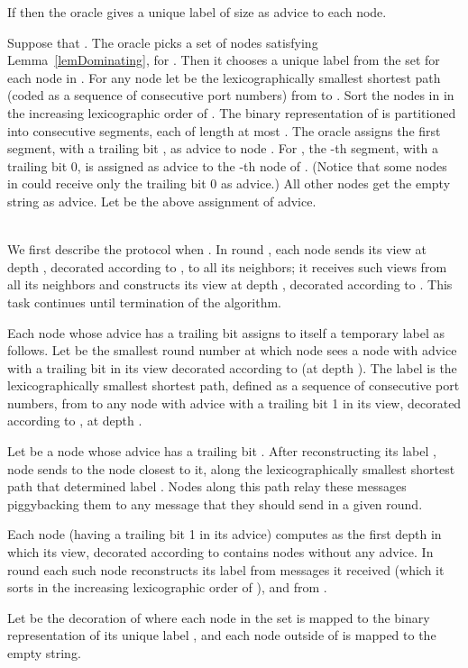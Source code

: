 \documentclass{article}
\begin{document}
If  then the oracle gives a unique label of size  as advice to each node.

Suppose that .
The oracle picks a set of nodes  satisfying Lemma~\ref{lemDominating}, for .
Then it chooses a unique label  from the set  for each node  in .
For any node  let  be the lexicographically smallest shortest path (coded as a sequence of consecutive port numbers) from  to .
Sort the nodes  in  in the increasing lexicographic order of .
The binary representation of  is partitioned into  consecutive segments, each of length at most .
The oracle assigns the first segment, with a trailing bit ,  as advice to node .
For , the -th segment, with a trailing bit 0, is assigned as advice to the -th  node of . (Notice that some nodes in  could receive only the trailing bit 0 as advice.) All other nodes get the empty string as advice.
Let  be the above assignment of advice.

\\
We first describe the protocol when .
In round , each node  sends its view at depth , decorated according to , to all its neighbors;
it receives such views from all its neighbors and constructs its view at depth , decorated according to .
This task continues until termination of the algorithm.

Each node  whose advice has a trailing bit  assigns to itself a temporary label  as follows.
Let  be the smallest round number at which node  sees a node with advice with a trailing bit  in its view decorated according to   (at depth ).
The label  is the lexicographically smallest shortest path, defined as a sequence of consecutive port numbers, from  to any node with advice with a trailing bit 1 in its  view, decorated according to , at depth .

Let  be a node whose advice has a trailing bit . After reconstructing its label , node  sends  to the node  closest to it, along the lexicographically smallest shortest path that determined label . Nodes along this path relay these messages piggybacking them to any message that they should send in a given round.


Each  node  (having a trailing bit 1 in its advice) computes  as the first depth in which its view, decorated according to  contains nodes without any advice.
In round  each such node reconstructs its label  from messages  it received (which it sorts in the increasing lexicographic order of ), and from .

Let  be the decoration of  where each node  in the set  is mapped to the binary representation of its unique label , and each node outside of  is mapped to the empty string.
\end{document}
